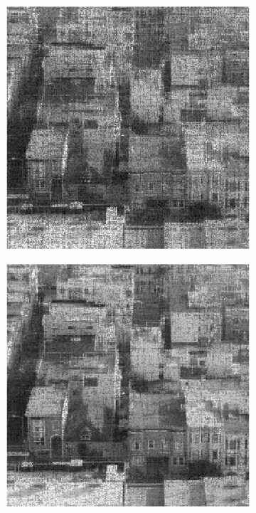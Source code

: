 \begin{figure}
    \begin{subfigure}{0.325\linewidth}
        \includegraphics[width=\linewidth]{Poglavja/Slike/kompleksna grayscale 300/rez35SVT.png}
    \end{subfigure}
    \hfill
    \begin{subfigure}{0.325\linewidth}
        \includegraphics[width=\linewidth]{Poglavja/Slike/kompleksna grayscale 300/rez45SVT.png}

\end{subfigure}
\end{figure}
